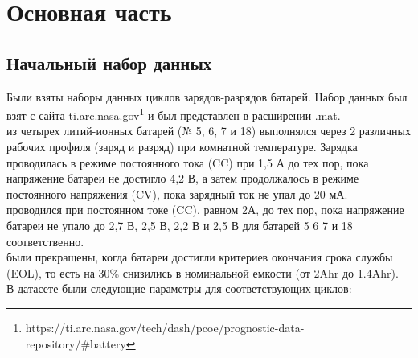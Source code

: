 \documentclass[russian,english,18pt,a4paper,reqno,dviphfm]{article}
\begin{document}
\section{Основная часть}
\subsection{Начальный набор данных}
Были взяты наборы данных циклов зарядов-разрядов батарей.
		Набор данных был взят с сайта ti.arc.nasa.gov\footnote{https://ti.arc.nasa.gov/tech/dash/pcoe/prognostic-data-repository/\#battery} и был представлен в расширении .mat.
		\\
		 из четырех литий-ионных батарей (№ 5, 6, 7 и 18) выполнялся через 2 различных рабочих профиля (заряд и разряд) при комнатной температуре. Зарядка проводилась в режиме постоянного тока (CC) при 1,5 А до тех пор, пока напряжение батареи не достигло 4,2 В, а затем продолжалось в режиме постоянного напряжения (CV), пока зарядный ток не упал до 20 мА. 
		\\
		 проводился при постоянном токе (CC), равном 2А, до тех пор, пока напряжение батареи не упало до 2,7 В, 2,5 В, 2,2 В и 2,5 В для батарей 5 6 7 и 18 соответственно. 
		\\
		 были прекращены, когда батареи достигли критериев окончания срока службы (EOL), то есть на 30\% снизились в номинальной емкости (от 2Ahr до 1.4Ahr).\\
		В датасете были следующие параметры для соответствующих циклов: 
\end{document}
